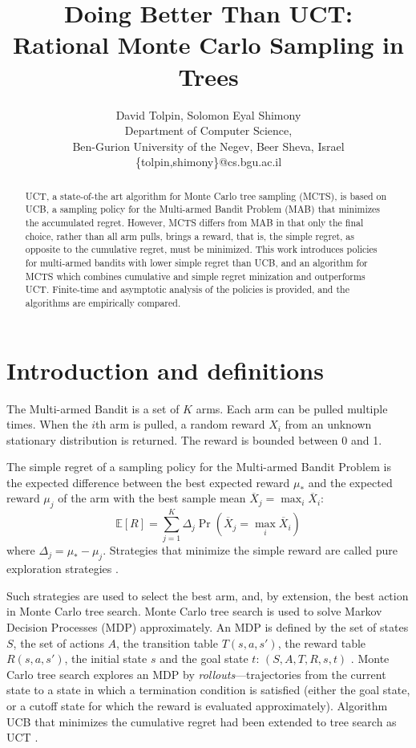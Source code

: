 \documentclass{article}
\title{Doing Better Than UCT: \\ Rational Monte Carlo Sampling in Trees}
\author {David Tolpin, Solomon Eyal Shimony \\
Department of Computer Science, \\
Ben-Gurion University of the Negev, Beer Sheva, Israel \\
\{tolpin,shimony\}@cs.bgu.ac.il}
\newcommand {\IE} {\ensuremath {\mathbb{E}}}
\begin{document}
\maketitle

\begin{abstract}
UCT, a state-of-the art algorithm for Monte Carlo tree sampling
(MCTS), is based on UCB, a sampling policy for the Multi-armed Bandit
Problem (MAB) that minimizes the accumulated regret. However, MCTS
differs from MAB in that only the final choice, rather than all arm
pulls, brings a reward, that is, the simple regret, as opposite to the
cumulative regret, must be minimized. This work introduces policies for
multi-armed bandits with lower simple regret than UCB, and an
algorithm for MCTS which combines cumulative and simple regret
minization and outperforms UCT. Finite-time and asymptotic analysis of
the policies is provided, and the algorithms are empirically compared.
\end{abstract}

\section{Introduction and definitions}

The Multi-armed Bandit is a set of $K$ arms. Each arm can be pulled
multiple times. When the $i$th arm is pulled, a random reward $X_i$
from an unknown stationary distribution is returned.  The reward is 
bounded between 0 and 1. 

The simple regret of a sampling policy for the Multi-armed Bandit
Problem is the expected difference between the best expected reward
$\mu_*$ and the expected reward $\mu_j$ of the arm with the best sample mean
$\overline X_j=\max_i\overline X_i$:
\begin{equation}
\label{eq:simple-regret}
\IE[R]=\sum_{j=1}^K\Delta_j\Pr(\overline X_j=\max_i\overline X_i)
\end{equation}
where $\Delta_j=\mu_*-\mu_j$.
Strategies that minimize the simple reward are called pure exploration
strategies \cite{Bubeck.pure}.

Such strategies are used to select the best arm, and, by extension,
the best action in Monte Carlo tree search. Monte Carlo tree search is
used to solve Markov Decision Processes (MDP) approximately. An MDP is
defined by the set of states $S$, the set of actions $A$, the
transition table $T(s, a, s')$, the reward table $R(s, a, s')$, the
initial state $s$ and the goal state $t$: $(S, A, T, R, s, t)$
\cite{Russell.aima}.  Monte Carlo tree search explores an MDP by
\emph{rollouts}---trajectories from the current state to a state in
which a termination condition is satisfied (either the goal state, or
a cutoff state for which the reward is evaluated
approximately). Algorithm UCB that minimizes the cumulative regret
\cite{Auer.ucb} had been extended to tree search as UCT
\cite{Kocsis.uct}.
\end{document}
